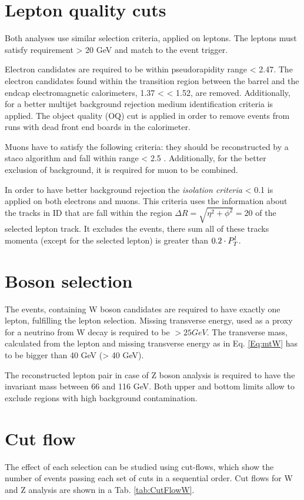 \section{Lepton quality cuts}

Both analyses use similar selection criteria, applied on leptons. The leptons must satisfy requirement \ptl > 20 GeV and match to the event trigger.

Electron candidates are required to be within pseudorapidity range \etall < 2.47. The electron candidates found within the transition region between the barrel and the endcap electromagnetic calorimeters, 1.37 < \etall < 1.52, are removed.  Additionally, for a better multijet background rejection  medium identification criteria is applied. The object quality (OQ) cut is applied in order to remove events from runs with dead front end boards in the calorimeter. 

Muons have to satisfy the following criteria: they should be reconstructed by a staco algorithm and fall within range \etall < 2.5 . Additionally, for the better exclusion of background, it is required for muon to be combined. 

In order to have better background rejection the \textit{isolation criteria} \ptcone < 0.1 is applied on both electrons and muons. This criteria uses the information about the tracks in ID that are fall within the region $\Delta R = \sqrt{\eta^2+\phi^2}=20$ of the selected lepton track. It excludes the events, there sum all of these tracks momenta (except for the selected lepton) is greater than $0.2\cdot P_T^l$.

\section{Boson selection}
The events, containing W boson candidates are required to have exactly one lepton, fulfilling the lepton selection. Missing transverse energy, used as a proxy for a neutrino from W decay is required to be \etmiss $>25 GeV$.  The transverse mass, calculated from the lepton and missing transverse energy as in Eq. \ref{Eq:mtW} has to be bigger than 40 GeV (\mtw > 40 GeV). 

The reconstructed lepton pair in case of Z boson analysis is required to have the invariant mass between 66 and 116 GeV. Both upper and bottom limits allow to exclude regions with high background contamination. 

\section{Cut flow}

The effect of each selection can be studied using cut-flows, which show the number of events passing each set of cuts in a sequential order. Cut flows for W and Z analysis are shown in a Tab. \ref{tab:CutFlowW}.

